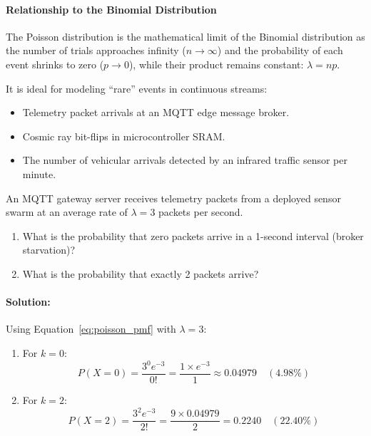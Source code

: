 \paragraph{Relationship to the Binomial Distribution}
The Poisson distribution is the mathematical limit of the Binomial distribution as the number of trials approaches infinity ($n \to \infty$) and the probability of each event shrinks to zero ($p \to 0$), while their product remains constant: $\lambda = np$. 

It is ideal for modeling ``rare'' events in continuous streams:
\begin{itemize}
    \item Telemetry packet arrivals at an MQTT edge message broker.
    \item Cosmic ray bit-flips in microcontroller SRAM.
    \item The number of vehicular arrivals detected by an infrared traffic sensor per minute.
\end{itemize}

\begin{example}
An MQTT gateway server receives telemetry packets from a deployed sensor swarm at an average rate of $\lambda = 3$ packets per second.
\begin{enumerate}
    \item What is the probability that zero packets arrive in a 1-second interval (broker starvation)?
    \item What is the probability that exactly 2 packets arrive?
\end{enumerate}

\paragraph{Solution:}
Using Equation~\eqref{eq:poisson_pmf} with $\lambda = 3$:
\begin{enumerate}
    \item For $k = 0$:
    \begin{equation*}
    P(X = 0) = \frac{3^0 e^{-3}}{0!} = \frac{1 \times e^{-3}}{1} \approx \mathbf{0.04979} \quad (4.98\%)
    \end{equation*}
    \item For $k = 2$:
    \begin{equation*}
    P(X = 2) = \frac{3^2 e^{-3}}{2!} = \frac{9 \times 0.04979}{2} = \mathbf{0.2240} \quad (22.40\%)
    \end{equation*}
\end{enumerate}
\end{example}


